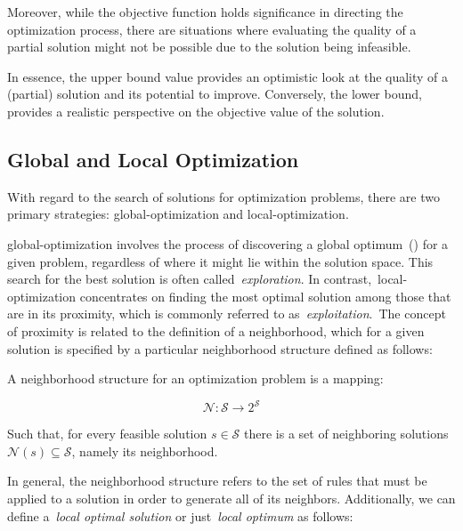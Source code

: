 Moreover, while the objective function holds significance in directing the
optimization process, there are situations where evaluating the quality of a
partial solution might not be possible due to the solution being infeasible.

In essence, the upper bound value provides an optimistic look at the quality of
a (partial) solution and its potential to improve. Conversely, the lower bound,
provides a realistic perspective on the objective value of the solution.

\subsection{Global and Local Optimization}
\label{subsec:go-and-lo}

With regard to the search of solutions for optimization problems, there are two
primary strategies: \acrfull{global-optimization} and \acrfull{local-optimization}.

\acrshort{global-optimization} involves the process of discovering a global
optimum~() for a given problem, regardless of where it
might lie within the solution space. This search for the best solution is often
called~\textit{exploration}. In contrast,~\acrshort{local-optimization}
concentrates on finding the most optimal solution among those that are in its
proximity, which is commonly referred to as~\textit{exploitation}.~The concept
of proximity is related to the definition of a neighborhood, which for a given
solution is specified by a particular neighborhood structure defined as follows:

\begin{definition}
  \label{def:neighborhood-structure}

  A neighborhood structure for an optimization problem is a mapping:

  \begin{equation}
    \label{eq:neighborhood-structure}
    \mathcal{N} \colon \mathcal{S} \longrightarrow 2^{\mathcal{S}}
  \end{equation}

  Such that, for every feasible solution $s \in \mathcal{S}$ there is a set of neighboring
  solutions $\mathcal{N}(s) \subseteq \mathcal{S}$, namely its neighborhood.

\end{definition}

In general, the neighborhood structure refers to the set of rules that must be
applied to a solution in order to generate all of its neighbors.  Additionally,
we can define a~\emph{local optimal solution} or just~\emph{local optimum} as follows:

